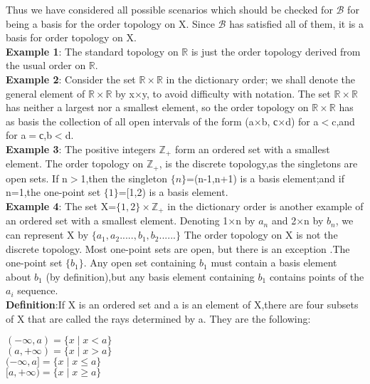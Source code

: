 \documentclass[a4paper,english,12pt]{article}
\begin{document}
\begin{flushleft}
Thus we have considered all possible scenarios which should be checked for $\mathscr{B}$ for being a basis for the order topology on X. Since $\mathscr{B}$ has satisfied all of them, it is a basis for order topology on X.\\
\vspace{1mm}
{\bf Example 1}: The standard topology on $\mathbb{R}$ is just the order topology derived from the usual order on $\mathbb{R}$.\\
\vspace{1mm}
{\bf Example 2}: Consider the set $\mathbb{R}\times\mathbb{R}$ in the dictionary order; we shall denote the general element of $\mathbb{R}\times\mathbb{R}$ by x$\times$y, to avoid difficulty with notation. The set $\mathbb{R}\times\mathbb{R}$ has neither a
largest nor a smallest element, so the order topology on $\mathbb{R}\times\mathbb{R}$ has as basis the collection of all open intervals of the form (a$\times$b, с$\times$d) for a$<$c,and for a$=$с,b$<$d.\\
{\bf Example 3}: The positive integers $\mathbb{Z}_+$ form an ordered set with a smallest element. The order topology on $\mathbb{Z}_+$, is the discrete topology,as the singletons are open sets. If n$>$1,then the singleton $\{n\}$=(n-1,n+1) is a basis element;and if n=1,the one-point set $\{1\}$=[1,2) is a basis element.\\
{\bf Example 4}: The set X=$\{1,2\}\times\mathbb{Z}_+$ in the dictionary order is another example of an ordered set with a smallest element. Denoting 1$\times$n by $a_n$ and 2$\times$n by $b_n$, we can represent X by $\{a_1,a_2.....,b_1,b_2......\}$
The order topology on X is not the discrete topology. Most one-point sets are open, but
there is an exception .The one-point set $\{b_1\}$. Any open set containing $b_1$ must contain a basis element about $b_1$ (by definition),but any basis element containing $b_1$ contains points of the $a_i$ sequence.\\
\vspace{2mm}
{\bf Definition}:If X is an ordered set and a is an element of X,there are four subsets of X that are called the rays determined by a. They are the following:\\
\begin{center}
$(-\infty,a)=\{x\mid x<a\}$\\
$(a,+\infty)=\{x\mid x>a\}$\\
$(-\infty,a]=\{x\mid x\leq a\}$\\
$[a,+\infty)=\{x\mid x\geq a\}$\\
\end{center}


\end{flushleft}
\end{document}
